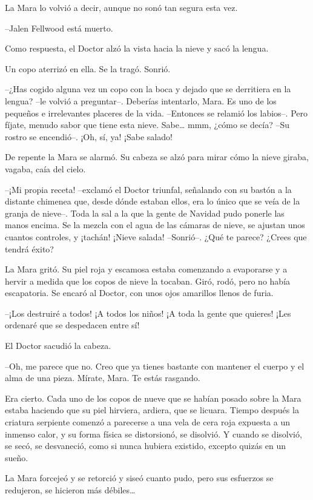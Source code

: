 La Mara lo volvió a decir, aunque no sonó tan segura esta vez.

--Jalen Fellwood está muerto.

Como respuesta, el Doctor alzó la vista hacia la nieve y sacó la lengua.

Un copo aterrizó en ella. Se la tragó. Sonrió.

--¿Has cogido alguna vez un copo con la boca y dejado que se derritiera en la lengua? --le volvió a preguntar--. Deberías intentarlo, Mara. Es uno de los pequeños e irrelevantes placeres de la vida. --Entonces se relamió los labios--. Pero fíjate, menudo sabor que tiene esta nieve. Sabe… mmm, ¿cómo se decía? --Su rostro se encendió--. ¡Oh, sí, ya! ¡Sabe salado!

De repente la Mara se alarmó. Su cabeza se alzó para mirar cómo la nieve giraba, vagaba, caía del cielo.

--¡Mi propia receta! --exclamó el Doctor triunfal, señalando con su bastón a la distante chimenea que, desde dónde estaban ellos, era lo único que se veía de la granja de nieve--. Toda la sal a la que la gente de Navidad pudo ponerle las manos encima. Se la mezcla con el agua de las cámaras de nieve, se ajustan unos cuantos controles, y ¡tachán! ¡Nieve salada! --Sonrió--. ¿Qué te parece? ¿Crees que tendrá éxito?

La Mara gritó. Su piel roja y escamosa estaba comenzando a evaporarse y a hervir a medida que los copos de nieve la tocaban. Giró, rodó, pero no había escapatoria. Se encaró al Doctor, con unos ojos amarillos llenos de furia.

--¡Los destruiré a todos! ¡A todos los niños! ¡A toda la gente que quieres! ¡Les ordenaré que se despedacen entre sí!

El Doctor sacudió la cabeza.

--Oh, me parece que no. Creo que ya tienes bastante con mantener el cuerpo y el alma de una pieza. Mírate, Mara. Te estás rasgando.

Era cierto. Cada uno de los copos de nueve que se habían posado sobre la Mara estaba haciendo que su piel hirviera, ardiera, que se licuara. Tiempo después la criatura serpiente comenzó a parecerse a una vela de cera roja expuesta a un inmenso calor, y su forma física se distorsionó, se disolvió. Y cuando se disolvió, se secó, se desvaneció, como si nunca hubiera existido, excepto quizás en un sueño.

La Mara forcejeó y se retorció y siseó cuanto pudo, pero sus esfuerzos se redujeron, se hicieron más débiles…

